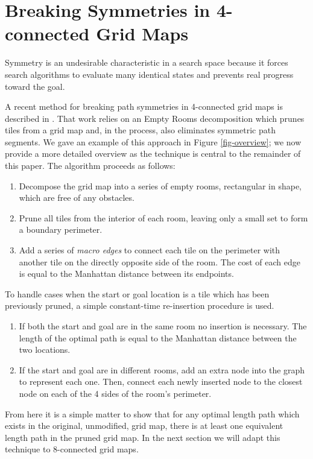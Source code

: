 \section{Breaking Symmetries in 4-connected Grid Maps}
Symmetry is an undesirable characteristic in a search space because it forces
search algorithms to evaluate many identical states and prevents real progress toward the goal.
\par
A recent method for breaking path symmetries in 4-connected grid maps is described in \cite{harabor10}.
That work relies on an Empty Rooms decomposition which prunes tiles from a grid map and, in the process, 
also eliminates symmetric path segments. 
We gave an example of this approach in Figure \ref{fig-overview}; we now provide a more detailed overview
as the technique is central to the remainder of this paper.
The algorithm proceeds as follows:
\begin{enumerate}
\item{Decompose the grid map into a series of empty rooms, rectangular in shape, which are free of any obstacles.}
\item{Prune all tiles from the interior of each room, leaving only a small set to form a boundary perimeter.} 
\item{Add a series of \emph{macro edges} to connect each tile on the perimeter with another tile on the directly opposite side
of the room. 
The cost of each edge is equal to the Manhattan distance between its endpoints.}
\end{enumerate}
To handle cases when the start or goal location is a tile which has been previously pruned, a simple constant-time
re-insertion procedure is used. 
\begin{enumerate}
\item{If both the start and goal are in the same room no insertion is necessary.
The length of the optimal path is equal to the Manhattan distance between the two locations.}
\item{If the start and goal are in different rooms, add an extra node into the graph to represent each one.
Then, connect each newly inserted node to the closest node on each of the 4 sides of the room's perimeter.}
\end{enumerate}
From here it is a simple matter to show that for any optimal length path which exists in the original, unmodified, grid
map, there is at least one equivalent length path in the pruned grid map. 
In the next section we will adapt this technique to 8-connected grid maps. 

